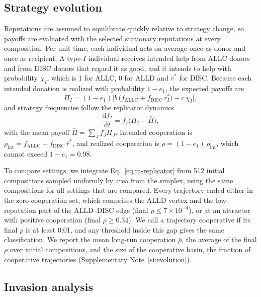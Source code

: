 \documentclass[10pt]{wlscirep}
\newcommand{\dd}{\mathrm{d}}
\newcommand{\ALLC}{\mathrm{ALLC}}
\newcommand{\DISC}{\mathrm{DISC}}
\theoremstyle{plain}
\theoremstyle{remark}
\begin{document}
\subsection*{Strategy evolution}

Reputations are assumed to equilibrate quickly relative to strategy change, so payoffs are evaluated with the selected stationary reputations at every composition. Per unit time, each individual acts on average once as donor and once as recipient. A type-$I$ individual receives intended help from ALLC donors and from DISC donors that regard it as good, and it intends to help with probability $\chi_I$, which is 1 for ALLC, 0 for ALLD and $\bar r^*$ for DISC. Because each intended donation is realized with probability $1-e_1$, the expected payoffs are
\begin{equation}
\Pi_I=(1-e_1)\bigl[b\,\bigl(f_{\ALLC}+f_{\DISC}\,r^*_I\bigr)-c\,\chi_I\bigr],
\label{eq:m-payoffs}
\end{equation}
and strategy frequencies follow the replicator dynamics~\cite{hofbauer1998}
\begin{equation}
\frac{\dd f_I}{\dd t}=f_I\bigl(\Pi_I-\bar\Pi\bigr),
\label{eq:m-replicator}
\end{equation}
with the mean payoff $\bar\Pi=\sum_Jf_J\Pi_J$. Intended cooperation is $\rho_{\mathrm{int}}=f_{\ALLC}+f_{\DISC}\,\bar r^*$, and realized cooperation is $\rho=(1-e_1)\,\rho_{\mathrm{int}}$, which cannot exceed $1-e_1=0.98$.

To compare settings, we integrate Eq.~\eqref{eq:m-replicator} from 512 initial compositions sampled uniformly by area from the simplex, using the same compositions for all settings that are compared. Every trajectory ended either in the zero-cooperation set, which comprises the ALLD vertex and the low-reputation part of the ALLD--DISC edge (final $\rho\leq7\times10^{-4}$), or at an attractor with positive cooperation (final $\rho\geq0.34$). We call a trajectory cooperative if its final $\rho$ is at least 0.01, and any threshold inside this gap gives the same classification. We report the mean long-run cooperation $\bar\rho$, the average of the final $\rho$ over initial compositions, and the size of the cooperative basin, the fraction of cooperative trajectories (Supplementary Note~\ref{si:evolution}).

\subsection*{Invasion analysis}
\end{document}
